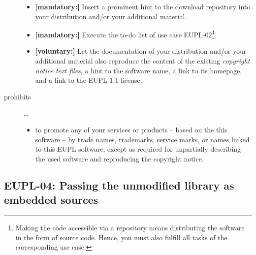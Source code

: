 \begin{description}
\begin{itemize}
 \item \textbf{[mandatory:]} Insert a prominent hint to the download repository
  into your distribution and/or your additional material.
  
  \item \textbf{[mandatory:]} Execute the to-do list of use case EUPL-02\footnote{
  Making the code accessible via a repository means distributing the software in
  the form of source code. Hence, you must also fulfill all tasks of the
  corresponding use case.}.
 
  \item \textbf{[voluntary:]} Let the documentation of your distribution and/or
  your additional material also reproduce the content of the existing
  \emph{copyright notice text files}, a hint to the software name, a link to its
  homepage, and a link to the EUPL 1.1 license.
\end{itemize}

\item[prohibits] \ldots
\begin{itemize}
  \item to promote any of your services or products -- based on the this software
  -- by trade names, trademarks, service marks, or names linked to this EUPL
  software, except as required for unpartially describing the used software and
  reproducing the copyright notice.
\end{itemize}

\end{description}

\subsection{EUPL-04: Passing the unmodified library as embedded sources}
\label{OSUC-07S-EUPL}

